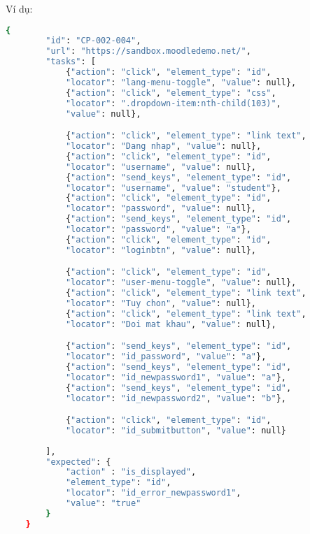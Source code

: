 Ví dụ:
\begin{lstlisting}[language=bash, caption={Ví dụ testcase CP-002-004 ở level 2}]
    {
        "id": "CP-002-004",
        "url": "https://sandbox.moodledemo.net/",
        "tasks": [
            {"action": "click", "element_type": "id", 
            "locator": "lang-menu-toggle", "value": null},
            {"action": "click", "element_type": "css", 
            "locator": ".dropdown-item:nth-child(103)", 
            "value": null},

            {"action": "click", "element_type": "link text", 
            "locator": "Dang nhap", "value": null},
            {"action": "click", "element_type": "id", 
            "locator": "username", "value": null},
            {"action": "send_keys", "element_type": "id", 
            "locator": "username", "value": "student"},
            {"action": "click", "element_type": "id", 
            "locator": "password", "value": null},
            {"action": "send_keys", "element_type": "id", 
            "locator": "password", "value": "a"},
            {"action": "click", "element_type": "id", 
            "locator": "loginbtn", "value": null},

            {"action": "click", "element_type": "id", 
            "locator": "user-menu-toggle", "value": null},
            {"action": "click", "element_type": "link text", 
            "locator": "Tuy chon", "value": null},
            {"action": "click", "element_type": "link text", 
            "locator": "Doi mat khau", "value": null},

            {"action": "send_keys", "element_type": "id", 
            "locator": "id_password", "value": "a"},
            {"action": "send_keys", "element_type": "id", 
            "locator": "id_newpassword1", "value": "a"},
            {"action": "send_keys", "element_type": "id", 
            "locator": "id_newpassword2", "value": "b"},

            {"action": "click", "element_type": "id", 
            "locator": "id_submitbutton", "value": null}
            
        ],
        "expected": {
            "action" : "is_displayed",
            "element_type": "id",
            "locator": "id_error_newpassword1",
            "value": "true"
        }
    }
\end{lstlisting}

